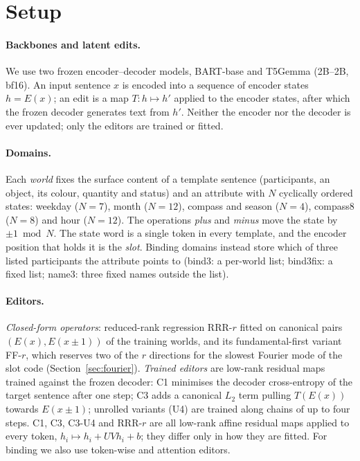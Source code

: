\section{Setup}\label{sec:setup}
\paragraph{Backbones and latent edits.}
We use two frozen encoder--decoder models, BART-base and T5Gemma (2B--2B, bf16). An input sentence $x$ is encoded into a sequence of
encoder states $h = E(x)$; an edit is a map $T: h \mapsto h'$ applied to the encoder states, after which the frozen decoder generates
text from $h'$. Neither the encoder nor the decoder is ever updated; only the editors are trained or fitted.

\paragraph{Domains.}
Each \emph{world} fixes the surface content of a template sentence (participants, an object, its colour, quantity and status) and an
attribute with $N$ cyclically ordered states: weekday ($N=7$), month ($N=12$), compass and season ($N=4$), compass8 ($N=8$) and hour
($N=12$). The operations \emph{plus} and \emph{minus} move the state by $\pm1 \bmod N$. The state word is a single token in every
template, and the encoder position that holds it is the \emph{slot}. Binding domains instead store which of three listed participants
the attribute points to (bind3: a per-world list; bind3fix: a fixed list; name3: three fixed names outside the list).

\paragraph{Editors.}
\emph{Closed-form operators}: reduced-rank regression RRR-$r$ fitted on canonical pairs $(E(x), E(x\pm1))$ of the training worlds, and
its fundamental-first variant FF-$r$, which reserves two of the $r$ directions for the slowest Fourier mode of the slot code
(Section~\ref{sec:fourier}). \emph{Trained editors} are low-rank residual maps trained against the frozen decoder: C1 minimises the
decoder cross-entropy of the target sentence after one step; C3 adds a canonical $L_2$ term pulling $T(E(x))$ towards $E(x\pm1)$;
unrolled variants (U4) are trained along chains of up to four steps. C1, C3, C3-U4 and RRR-$r$ are all low-rank affine residual maps
applied to every token, $h_i \mapsto h_i + U V h_i + b$; they differ only in how they are fitted. For binding we also use token-wise and
attention editors.

